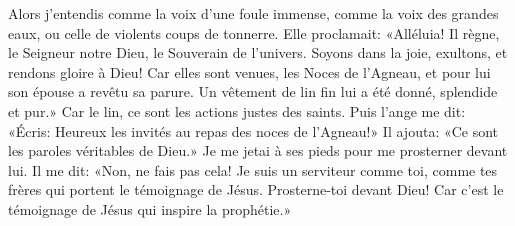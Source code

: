 Alors j’entendis comme la voix d’une foule immense,
	comme la voix des grandes eaux, ou celle de violents coups de tonnerre.
Elle proclamait:
	«Alléluia! Il règne, le Seigneur notre Dieu, le Souverain de l’univers.
Soyons dans la joie, exultons, et rendons gloire à Dieu!
	Car elles sont venues, les Noces de l’Agneau,
	et pour lui son épouse a revêtu sa parure.
Un vêtement de lin fin lui a été donné, splendide et pur.»
Car le lin, ce sont les actions justes des saints.
Puis l’ange me dit:
	«Écris: Heureux les invités au repas des noces de l’Agneau!»
	Il ajouta: «Ce sont les paroles véritables de Dieu.»
Je me jetai à ses pieds pour me prosterner devant lui.
	Il me dit: «Non, ne fais pas cela!
	Je suis un serviteur comme toi,
	comme tes frères qui portent le témoignage de Jésus.
Prosterne-toi devant Dieu!
	Car c’est le témoignage de Jésus qui inspire la prophétie.»
